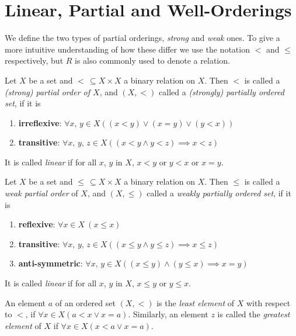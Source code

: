 \documentclass[../../main.tex]{subfiles}
\begin{document}
\section{Linear, Partial and Well-Orderings}

We define the two types of partial orderings, \textit{strong} and \textit{weak} ones.
To give a more intuitive understanding of how these differ we use the notation $<$ and $\leq$ respectively, but $R$ is also commonly used to denote a relation.

\begin{definition}\cite[p.165]{Gol17}
    Let $X$ be a set and $<\, \subseteq X \times X$ a binary relation on $X$.
    Then $<$ is called a \textit{(strong) partial order of $X$}, and $(X, <)$ called a \textit{(strongly) partially ordered set}, if it is
    \begin{enumerate}[label=(\roman*)]
        \item \textbf{irreflexive}: $\forall x,\, y \in X \left((x < y) \vee (x = y) \vee (y < x)\right)$
        \item \textbf{transitive}: $\forall x,\, y,\, z \in X \left(\left(x < y \wedge y < z\right) \implies x < z\right)$
    \end{enumerate}
    It is called \textit{linear} if for all $x$, $y$ in $X$, $x < y$ or $y < x$ or $x = y$.
\end{definition}

\begin{definition}\cite[p.164]{Gol17}
    Let $X$ be a set and $\leq\, \subseteq X \times X$ a binary relation on $X$.
    Then $\leq$ is called a \textit{weak partial order} of $X$, and $(X, \leq)$ called a \textit{weakly partially ordered set}, if it is
    \begin{enumerate}[label=(\roman*)]
        \item \textbf{reflexive}: $\forall x \in X \ (x \leq x)$
        \item \textbf{transitive}: $\forall x,\, y,\, z \in X \left(\left(x \leq y \wedge y \leq z\right) \implies x \leq z\right)$
        \item \textbf{anti-symmetric}: $\forall x,\, y \in X \left((x \leq y) \wedge (y \leq x) \implies x = y\right)$
    \end{enumerate}
    It is called \textit{linear} if for all $x$, $y$ in $X$, $x \leq y$ or $y \leq x$.
\end{definition}

\begin{definition}\cite[p.12]{Jec78}
    An element $a$ of an ordered set $\left(X, <\right)$ is the \textit{least element} of $X$ with respect to $<$, if $\forall x \in X  \left(a < x \vee x = a\right)$.
    Similarly, an element $z$ is called the \textit{greatest element} of $X$ if $\forall x \in X  \left(x < a \vee x = a\right)$.
\end{definition}
\end{document}
